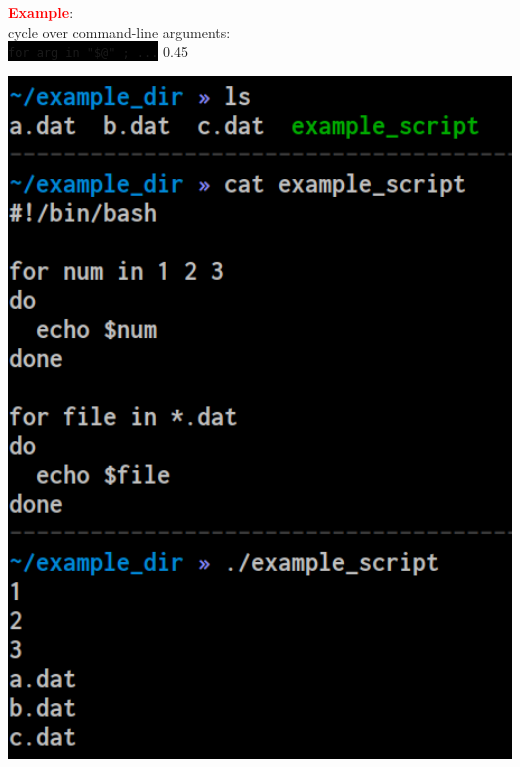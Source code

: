\documentclass[unknownkeysallowed, 10pt, a4 paper, handout]{beamer}
\newcommand{\focus}[1]{\textbf{\textcolor{red}{#1}}}
\newcommand{\code}[1]{\colorbox{black}{\color{green}\texttt{#1}}}
\begin{document}
\begin{frame}
\begin{center}
{      \focus{Example}:\\
      cycle over command-line arguments:\\
      \code{for arg in "\$@" ; ...}
    }{\hfill}{0.45}{
      \begin{center}
        \includegraphics[width=1.00\textwidth]{pics/for.png}
      \end{center}
    }
  \end{center}
\end{frame}
\end{document}
